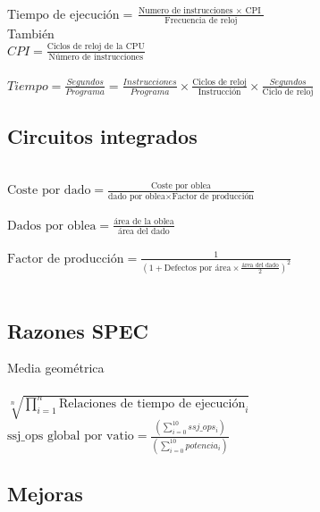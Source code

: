 \documentclass[11pt, letterpaper]{book}
\begin{document}
$\displaystyle\text{Tiempo de ejecución} = \frac{\text{Numero de instrucciones } \times {\text{ CPI }}}{\text{Frecuencia de reloj}}$\\

También\\

$\displaystyle CPI = \frac{\text{Ciclos de reloj de la CPU}}{\text{Número de instrucciones}}$\\\\

$\displaystyle Tiempo = \frac{Segundos}{Programa} = \frac{Instrucciones}{Programa}\times\frac{\text{Ciclos de reloj}}{\text{Instrucción}}\times\frac{Segundos}{\text{Ciclo de reloj}}  $

\subsection{Circuitos integrados}\\

$\displaystyle\text{Coste por dado} = \frac{\text{Coste por oblea}}{\text{dado por oblea}\times{\text{Factor de producción}}}$\\\\

$\displaystyle\text{Dados por oblea} = \frac{\text{área de la oblea}}{\text{área del dado}}$\\\\

$\displaystyle\text{Factor de producción} = \frac{1}{( 1 +\text{Defectos por área}\times{\frac{\text{área del dado}}{2}})^2}$\\\\

\subsection{Razones SPEC}

Media geométrica\\\\

$\displaystyle\sqrt[n]{\prod_{i=1}^{n}\text{Relaciones de tiempo de ejecución}_i}$\\

$\displaystyle\text{ssj\_ops global por vatio} = \frac{(\sum_{i=0}^{10}ssj\_ops_i)}{(\sum_{i=0}^{10}potencia_i)}$\\

\subsection{Mejoras}
\end{document}
